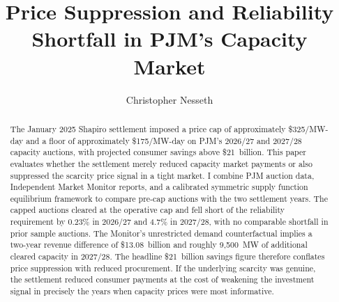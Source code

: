 \documentclass[12pt]{article}
\begin{document}

\title{Price Suppression and Reliability Shortfall in PJM's Capacity Market}
\author{Christopher Nesseth}
\date{}
\maketitle
\thispagestyle{empty}

\begin{abstract}
\singlespacing
The January 2025 Shapiro settlement imposed a price cap of approximately \$325/MW-day and a floor of approximately \$175/MW-day on PJM’s 2026/27 and 2027/28 capacity auctions, with projected consumer savings above \$21~billion. This paper evaluates whether the settlement merely reduced capacity market payments or also suppressed the scarcity price signal in a tight market. I combine PJM auction data, Independent Market Monitor reports, and a calibrated symmetric supply function equilibrium framework to compare pre-cap auctions with the two settlement years. The capped auctions cleared at the operative cap and fell short of the reliability requirement by 0.23\% in 2026/27 and 4.7\% in 2027/28, with no comparable shortfall in prior sample auctions. The Monitor’s unrestricted demand counterfactual implies a two-year revenue difference of \$13.08~billion and roughly 9{,}500~MW of additional cleared capacity in 2027/28. The headline \$21~billion savings figure therefore conflates price suppression with reduced procurement. If the underlying scarcity was genuine, the settlement reduced consumer payments at the cost of weakening the investment signal in precisely the years when capacity prices were most informative.
\end{abstract}

\newpage
\setcounter{page}{1}



















\newpage
\nocite{PJM_BRA_results, PJM_planning_parameters}

\end{document}
